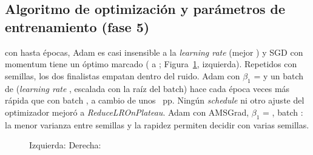 \subsection{Algoritmo de optimización y parámetros de entrenamiento (fase 5)}
{con hasta  épocas, Adam es casi insensible a la \emph{learning rate}
(mejor ) y SGD con momentum tiene un óptimo marcado ( a
; Figura~\ref{fig:train}, izquierda). Repetidos con  semillas, los dos finalistas
empatan dentro del ruido.}
{Adam con $\beta_1$ =  y un batch de  (\emph{learning rate} , escalada
con la raíz del batch) hace cada época  veces más rápida que con batch , a
cambio de unos ~pp. Ningún \emph{schedule} ni otro ajuste del optimizador mejoró a
\emph{ReduceLROnPlateau}.}
{Adam con AMSGrad, $\beta_1$ = , batch : la menor varianza entre semillas y la
rapidez permiten decidir con varias semillas.}

\begin{figure}[t]
  \centering
  \begin{minipage}[t]{0.49\linewidth}\centering
  \end{minipage}\hfill
  \begin{minipage}[t]{0.49\linewidth}\centering
  \end{minipage}
  \caption{Izquierda:  Derecha: }
  \label{fig:train}
\end{figure}
